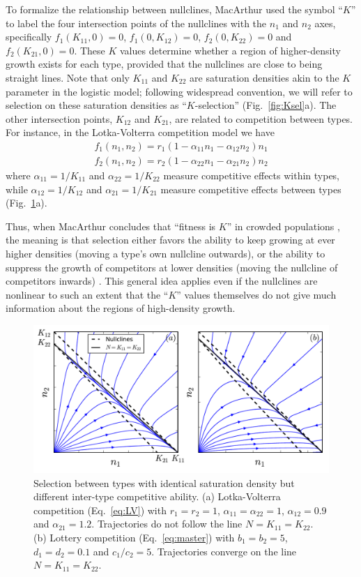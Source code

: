 \documentclass[11pt]{article}
\begin{document}
To formalize the relationship between nullclines, MacArthur used the symbol ``$K$'' to label the four intersection points of the nullclines with the $n_1$ and $n_2$ axes, specifically $f_1(K_{11},0)=0$, $f_1(0,K_{12})=0$, $f_2(0,K_{22})=0$ and $f_2(K_{21},0)=0$. These $K$ values determine whether a region of higher-density growth exists for each type, provided that the nullclines are close to being straight lines. Note that only $K_{11}$ and $K_{22}$ are saturation densities akin to the $K$ parameter in the logistic model; following widespread convention, we will refer to selection on these saturation densities as ``$K$-selection'' (Fig.~\ref{fig:Ksel}a). The other intersection points, $K_{12}$ and $K_{21}$, are related to competition between types. For instance, in the Lotka-Volterra competition model we have
\begin{align}
f_1(n_1,n_2) = r_1(1-\alpha_{11}n_1-\alpha_{12}n_2)n_1\nonumber\\
f_2(n_1,n_2) = r_2(1-\alpha_{22}n_1-\alpha_{21}n_2)n_2\label{eq:LV}
\end{align}
where $\alpha_{11}=1/K_{11}$ and $\alpha_{22}=1/K_{22}$ measure competitive effects within types, while $\alpha_{12}=1/K_{12}$ and $\alpha_{21}=1/K_{21}$ measure competitive effects between types (Fig.~\ref{fig:LVvslottery}a). 

Thus, when MacArthur concludes that  ``fitness is $K$'' in crowded populations \citep[pp. 149]{macarthur_1967}, the meaning is that selection either favors the ability to keep growing at ever higher densities (moving a type's own nullcline outwards), or the ability to suppress the growth of competitors at lower densities (moving the nullcline of competitors inwards) \citep{gill_1974}. This general idea applies even if the nullclines are nonlinear to such an extent that the ``$K$'' values themselves do not give much information about the regions of high-density growth.

\begin{figure}
\centering
\includegraphics[scale=0.8]{LVvslottery.pdf}
\caption{\label{fig:LVvslottery} Selection between types with identical saturation density but different inter-type competitive ability. (a) Lotka-Volterra competition (Eq.~\ref{eq:LV}) with $r_1=r_2=1$, $\alpha_{11}=\alpha_{22}=1$, $\alpha_{12}=0.9$ and $\alpha_{21}=1.2$. Trajectories do not follow the line $N=K_{11}=K_{22}$. (b) Lottery competition (Eq.~\ref{eq:master}) with $b_1=b_2=5$, $d_1=d_2=0.1$ and $c_1/c_2=5$. Trajectories converge on the line $N=K_{11}=K_{22}$.}
\end{figure}
\end{document}

